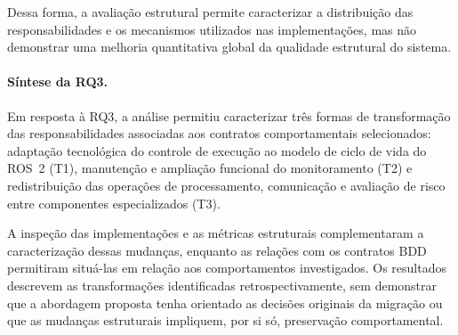 Dessa forma, a avaliação estrutural permite caracterizar a distribuição das responsabilidades e os mecanismos utilizados nas implementações, mas não demonstrar uma melhoria quantitativa global da qualidade estrutural do sistema.

\paragraph{Síntese da RQ3.}

Em resposta à RQ3, a análise permitiu caracterizar três formas de transformação das responsabilidades associadas aos contratos comportamentais selecionados: adaptação tecnológica do controle de execução ao modelo de ciclo de vida do ROS~2 (T1), manutenção e ampliação funcional do monitoramento (T2) e redistribuição das operações de processamento, comunicação e avaliação de risco entre componentes especializados (T3).

A inspeção das implementações e as métricas estruturais complementaram a caracterização dessas mudanças, enquanto as relações com os contratos BDD permitiram situá-las em relação aos comportamentos investigados. Os resultados descrevem as transformações identificadas retrospectivamente, sem demonstrar que a abordagem proposta tenha orientado as decisões originais da migração ou que as mudanças estruturais impliquem, por si só, preservação comportamental.

